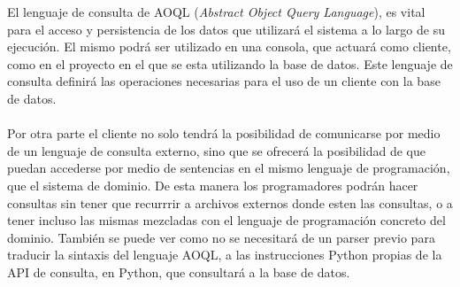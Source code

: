 \documentclass{melta}
\begin{document}
El lenguaje de consulta de AOQL (\textit{Abstract Object Query Language}), es vital para el acceso y persistencia de los datos que utilizará el sistema a lo largo de su ejecución. El mismo podrá ser utilizado en una consola, que actuará como cliente, como en el proyecto en el que se esta utilizando la base de datos. 
Este lenguaje de consulta definirá las operaciones necesarias para el uso de un cliente con la base de datos.
\\\\
Por otra parte el cliente no solo tendrá la posibilidad de comunicarse por medio de un lenguaje de consulta externo, sino que se ofrecerá la posibilidad de que puedan accederse por medio de sentencias en el mismo lenguaje de programación, que el sistema de dominio. De esta manera los programadores podrán hacer consultas sin tener que recurrrir a archivos externos donde esten las consultas, o a tener incluso las mismas mezcladas con el lenguaje de programación concreto del dominio. También se puede ver como no se necesitará de un parser previo para traducir la sintaxis del lenguaje AOQL, a las instrucciones Python propias de la API de consulta, en Python, que consultará a la base de datos.
\\\\
\label{table:gramatica}
\end{document}
